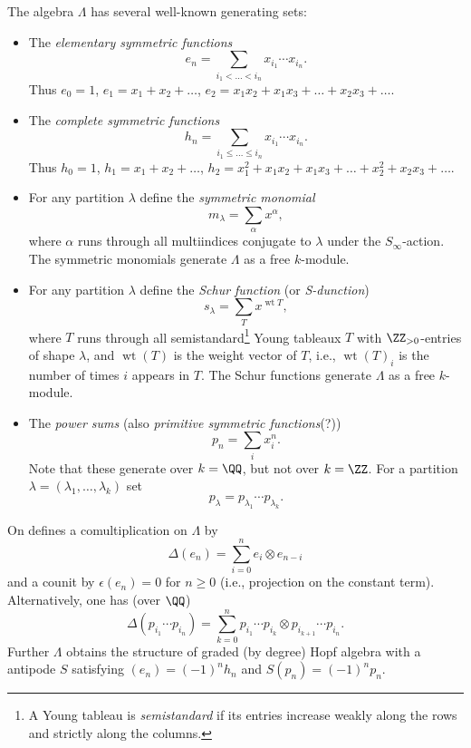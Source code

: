 \documentclass{ck-article}
\newcommand\SymGrp[1]{S_{#1}}
\begin{document}
The algebra $\Lambda$ has several well-known generating sets:
\begin{itemize}
    \item The \emph{elementary symmetric functions} 
        \[
            e_n = \sum_{i_1 < \dots < i_n} x_{i_1} \dotsm x_{i_n}.
        \]
        Thus $e_0 = 1$, $e_1 = x_1 + x_2 + \dots$, $e_2 = x_1x_2 + x_1x_3 + \dots + x_2x_3  + \dots$.
    \item The \emph{complete symmetric functions} 
        \[
            h_n = \sum_{i_1 \le \dots \le i_n} x_{i_1} \dotsm x_{i_n}.
        \]
        Thus $h_0 = 1$, $h_1 = x_1 + x_2 + \dots$, $h_2 = x_1^2 + x_1x_2 + x_1x_3 + \dots + x_2^2 + x_2x_3  + \dots$.
    \item For any partition $\lambda$ define the \emph{symmetric monomial}
        \[
            m_\lambda = \sum_{\alpha} x^\alpha,
        \]
        where $\alpha$ runs through all multiindices conjugate to $\lambda$ under the $\SymGrp\infty$-action.
        The symmetric monomials generate $\Lambda$ as a free $k$-module.
    \item For any partition $\lambda$ define the \emph{Schur function} (or \emph{S-dunction})
        \[
            s_\lambda = \sum_T x^{\operatorname{wt} T},
        \]
        where $T$ runs through all semistandard\footnote{A Young tableau is \emph{semistandard} if its entries increase weakly along the rows and strictly along the columns.} Young tableaux $T$ with $\ZZ_{>0}$-entries of shape $\lambda$, and $\operatorname{wt}(T)$ is the weight vector of $T$, i.e., $\operatorname{wt}(T)_i$ is the number of times $i$ appears in $T$.
        The Schur functions generate $\Lambda$ as a free $k$-module.
    \item The \emph{power sums} (also \emph{primitive symmetric functions}(?))
        \[
            p_n = \sum_i x_i^n.
        \]
        Note that these generate over $k = \QQ$, but not over $k=\ZZ$.
        For a partition $\lambda = (\lambda_1,\dots,\lambda_k)$ set
        \[
            p_\lambda = p_{\lambda_1}\dotsm p_{\lambda_k}.
        \]
\end{itemize}
On defines a comultiplication on $\Lambda$ by
\[
    \Delta(e_n) = \sum_{i=0}^n e_i \otimes e_{n-i}
\]
and a counit by $\epsilon(e_n) = 0$ for $n \ge 0$ (i.e., projection on the constant term).
Alternatively, one has (over $\QQ$)
\[
    \Delta(p_{i_1}\dotsm p_{i_n}) = \sum_{k=0}^n p_{i_1}\dotsm p_{i_k} \otimes p_{i_{k+1}}\dotsm p_{i_n}.
\]
Further $\Lambda$ obtains the structure of graded (by degree) Hopf algebra with a antipode $S$ satisfying $(e_n) = (-1)^n h_n$ and $S(p_n) = (-1)^np_n$.
\end{document}
